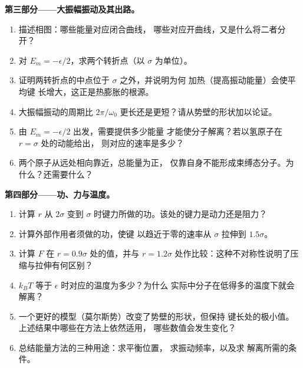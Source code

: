 \begin{problem}
\medskip
\noindent\textbf{第三部分——大振幅振动及其出路。}
\begin{enumerate}[resume]
  \item 描述相图：哪些能量对应闭合曲线，
        哪些对应开曲线，又是什么将二者分开？
  \item 对 $E_m = -\epsilon/2$，求两个转折点（以
        $\sigma$ 为单位）。
  \item 证明两转折点的中点位于 $\sigma$ 之外，并说明为何
        加热（提高振动能量）会使平均键
        长增大，这正是热膨胀的根源。
  \item 大振幅振动的周期比
        $2\pi/\omega_0$ 更长还是更短？请从势壁的形状加以论证。
  \item 由 $E_m = -\epsilon/2$ 出发，需要提供多少能量
        才能使分子解离？若以氢原子在 $r = \sigma$ 处的动能给出，
        则对应的速率是多少？
  \item 两个原子从远处相向靠近，总能量为正，
        仅靠自身不能形成束缚态分子。为什么？还需要什么？
\end{enumerate}

\medskip
\noindent\textbf{第四部分——功、力与温度。}
\begin{enumerate}[resume]
  \item 计算 $r$ 从 $2\sigma$ 变到
        $\sigma$ 时键力所做的功。该处的键力是动力还是阻力？
  \item 计算外部作用者须做的功，使键
        以趋近于零的速率从 $\sigma$ 拉伸到 $1.5\sigma$。
  \item 计算 $F$ 在 $r = 0.9\sigma$ 处的值，并与
        $r = 1.2\sigma$ 处作比较：这种不对称性说明了压缩与拉伸有何区别？
  \item $k_BT$ 等于 $\epsilon$ 时对应的温度为多少？为什么
        实际中分子在低得多的温度下就会解离？
  \item 一个更好的模型（莫尔斯势）改变了势壁的形状，但保持
        键长处的极小值。上述结果中哪些在方法上依然适用，
        哪些数值会发生变化？
  \item 总结能量方法的三种用途：求平衡位置，
        求振动频率，以及求
        解离所需的条件。
\end{enumerate}
\end{problem}
